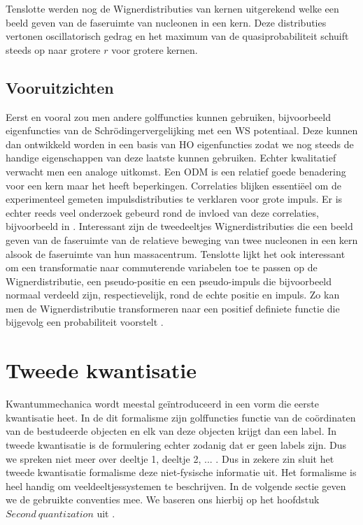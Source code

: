 \documentclass[11pt,twoside]{book}
\begin{document}
Tenslotte werden nog de Wignerdistributies van kernen uitgerekend welke een beeld geven van de faseruimte van nucleonen in een kern.
Deze distributies vertonen oscillatorisch gedrag en het maximum van de quasiprobabiliteit schuift steeds op naar grotere $r$ voor grotere kernen.


\section{Vooruitzichten}

Eerst en vooral zou men andere golffuncties kunnen gebruiken, bijvoorbeeld eigenfuncties van de Schr\"{o}dingervergelijking met een WS potentiaal. Deze kunnen dan ontwikkeld worden in een basis van HO eigenfuncties zodat we nog steeds de handige eigenschappen van deze laatste kunnen gebruiken. Echter kwalitatief verwacht men een analoge uitkomst.
Een ODM is een relatief goede benadering voor een kern maar het heeft beperkingen. Correlaties blijken essenti\"{e}el om de experimenteel gemeten impulsdistributies te verklaren voor grote impuls. Er is echter reeds veel onderzoek gebeurd rond de invloed van deze correlaties, bijvoorbeeld in \cite{maarten,ryckebusch2015stylized,wiringa2014nucleon}.
Interessant zijn de tweedeeltjes Wignerdistributies die een beeld geven van de faseruimte van de relatieve beweging van twee nucleonen in een kern alsook de faseruimte van hun massacentrum.
Tenslotte lijkt het ook interessant om een transformatie naar commuterende variabelen toe te passen op de Wignerdistributie, een pseudo-positie en een pseudo-impuls die bijvoorbeeld normaal verdeeld zijn, respectievelijk, rond de echte positie en impuls. Zo kan men de Wignerdistributie transformeren naar een positief definiete functie die bijgevolg een probabiliteit voorstelt \cite{PhysRev.120.254}. 


\newpage
\appendix
{}

\chapter{ Tweede kwantisatie} 
Kwantummechanica wordt meestal ge\"{i}ntroduceerd in een vorm die eerste kwantisatie heet. In de dit formalisme zijn golffuncties functie van de co\"{o}rdinaten van de bestudeerde objecten en elk van deze objecten krijgt dan een label. In tweede kwantisatie  is de formulering echter zodanig  dat er geen labels zijn. Dus we spreken niet meer over deeltje 1, deeltje 2, ... . Dus in zekere zin sluit het tweede kwantisatie formalisme deze niet-fysische informatie uit. Het formalisme is heel handig om veeldeeltjessystemen te beschrijven. In de volgende sectie geven we de gebruikte conventies mee. We baseren ons hierbij op het hoofdstuk $Second\ quantization$ uit \cite{dimitri}.
\end{document}
